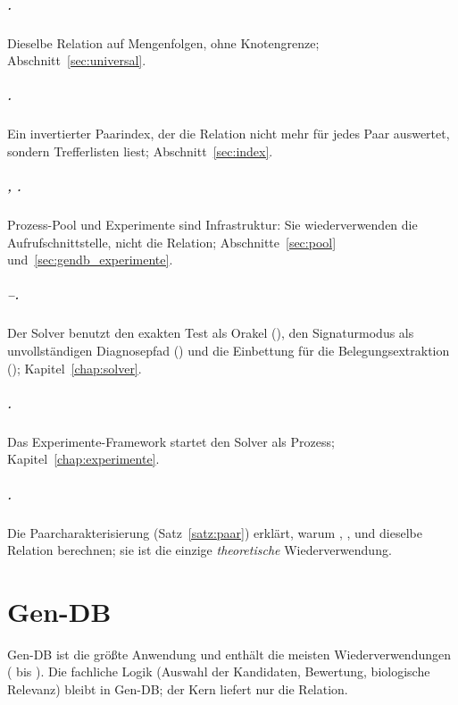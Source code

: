 \paragraph{.} Dieselbe Relation auf Mengenfolgen, ohne Knotengrenze; Abschnitt~\ref{sec:universal}.

\paragraph{.} Ein invertierter Paarindex, der die Relation nicht mehr für jedes Paar auswertet, sondern Trefferlisten liest; Abschnitt~\ref{sec:index}.

\paragraph{, .} Prozess-Pool und Experimente sind Infrastruktur: Sie wiederverwenden die Aufrufschnittstelle, nicht die Relation; Abschnitte~\ref{sec:pool} und~\ref{sec:gendb_experimente}.

\paragraph{--.} Der Solver benutzt den exakten Test als Orakel (), den Signaturmodus als unvollständigen Diagnosepfad () und die Einbettung für die Belegungsextraktion (); Kapitel~\ref{chap:solver}.

\paragraph{.} Das Experimente-Framework startet den Solver als Prozess; Kapitel~\ref{chap:experimente}.

\paragraph{.} Die Paarcharakterisierung (Satz~\ref{satz:paar}) erklärt, warum , ,  und  dieselbe Relation berechnen; sie ist die einzige \emph{theoretische} Wiederverwendung.

\chapter{Gen-DB}
\label{chap:gendb}

Gen-DB ist die größte Anwendung und enthält die meisten Wiederverwendungen ( bis ). Die fachliche Logik (Auswahl der Kandidaten, Bewertung, biologische Relevanz) bleibt in Gen-DB; der Kern liefert nur die Relation.

